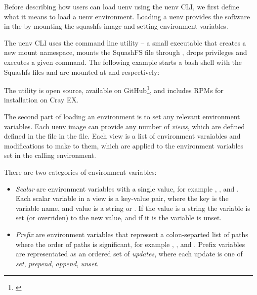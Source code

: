
Before describing how users can load uenv using the uenv CLI, we first define what it means to load a uenv environment.
Loading a uenv provides the software in the \squashfs by mounting the squashfs image and setting environment variables.

The uenv CLI uses the  command line utility -- a small  executable that creates a new mount namespace, mounts the SquashFS file through , drops privileges and executes a given command.
The following example starts a bash shell with the Squashfs files  and  are mounted at  and  respectively:

The utility is open source, available on GitHub\footnote{\href{https://github.com/eth-cscs/squashfs-mount}{}}, and includes RPMs for installation on Cray EX.

The second part of loading an environment is to set any relevant environment variables.
Each uenv image can provide any number of \emph{views}, which are defined defined in the  file in the \squashfs file.
Each view is a list of environment varaiables and modifications to make to them, which are applied to the environment variables set in the calling environment.

There are two categories of environment variables:
\begin{itemize}
    \item \emph{Scalar} are environment variables with a single value, for example , , and .
        Each scalar variable in a view is a key-value pair, where the key is the variable name, and value is a string or .
        If the value is a string the variable is set (or overriden) to the new value, and if it is  the variable is unset.
    \item \emph{Prefix} are environment variables that represent a colon-separted list of paths where the order of paths is significant, for example , , and .
        Prefix variables are representated as an ordered set of \emph{updates}, where each update is one of \emph{set}, \emph{prepend}, \emph{append}, \emph{unset}.
\end{itemize}

